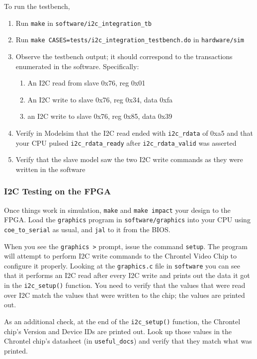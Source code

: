 \documentclass[11pt]{article}
\begin{document}
To run the testbench,
\begin{enumerate}
	\item Run \verb|make| in \verb|software/i2c_integration_tb|
	\item Run \verb|make CASES=tests/i2c_integration_testbench.do| in \verb|hardware/sim|
	\item Observe the testbench output; it should correspond to the transactions enumerated in the software. Specifically:
	\begin{enumerate}
		\item An I2C read from slave 0x76, reg 0x01
		\item An I2C write to slave 0x76, reg 0x34, data 0xfa
		\item an I2C write to slave 0x76, reg 0x85, data 0x39
	\end{enumerate}
	\item Verify in Modelsim that the I2C read ended with \verb|i2c_rdata| of 0xa5 and that your CPU pulsed \verb|i2c_rdata_ready| after \verb|i2c_rdata_valid| was asserted
	\item Verify that the slave model saw the two I2C write commands as they were written in the software
\end{enumerate}

\subsubsection{I2C Testing on the FPGA}
Once things work in simulation, \verb|make| and \verb|make impact| your design to the FPGA. Load the \verb|graphics| program in \verb|software/graphics| into your CPU using \verb|coe_to_serial| as usual, and \verb|jal| to it from the BIOS.

When you see the \verb|graphics >| prompt, issue the command \verb|setup|. The program will attempt to perform I2C write commands to the Chrontel Video Chip to configure it properly. Looking at the \verb|graphics.c| file in \verb|software| you can see that it performs an I2C read after every I2C write and prints out the data it got in the \verb|i2c_setup()| function. You need to verify that the values that were read over I2C match the values that were written to the chip; the values are printed out.

As an additional check, at the end of the \verb|i2c_setup()| function, the Chrontel chip's Version and Device IDs are printed out. Look up those values in the Chrontel chip's datasheet (in \verb|useful_docs|) and verify that they match what was printed.
\end{document}
